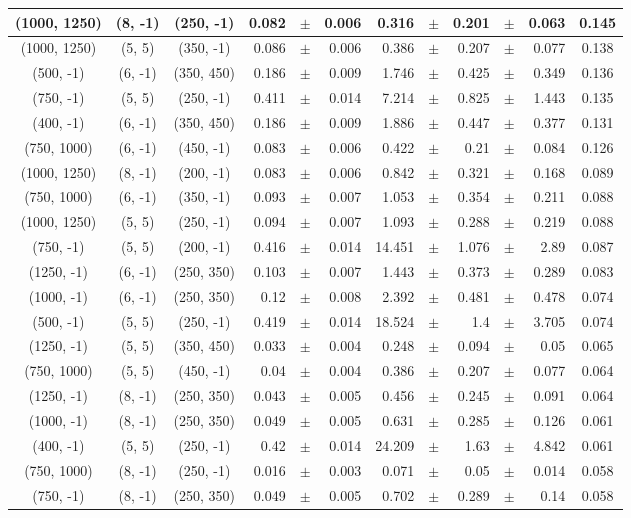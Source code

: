 \documentclass[12pt]{paper}
\begin{document}
\begin{table}[ht]
\begin{center}
{\begin{tabular}{|c|c|c|rrr|rrrrr|c|}
(1000, 1250)&(8, -1)&(250, -1)&0.082&$\pm$&0.006&0.316&$\pm$&0.201&$\pm$&0.063&0.145\\\hline
(1000, 1250)&(5, 5)&(350, -1)&0.086&$\pm$&0.006&0.386&$\pm$&0.207&$\pm$&0.077&0.138\\\hline
(500, -1)&(6, -1)&(350, 450)&0.186&$\pm$&0.009&1.746&$\pm$&0.425&$\pm$&0.349&0.136\\\hline
(750, -1)&(5, 5)&(250, -1)&0.411&$\pm$&0.014&7.214&$\pm$&0.825&$\pm$&1.443&0.135\\\hline
(400, -1)&(6, -1)&(350, 450)&0.186&$\pm$&0.009&1.886&$\pm$&0.447&$\pm$&0.377&0.131\\\hline
(750, 1000)&(6, -1)&(450, -1)&0.083&$\pm$&0.006&0.422&$\pm$&0.21&$\pm$&0.084&0.126\\\hline
(1000, 1250)&(8, -1)&(200, -1)&0.083&$\pm$&0.006&0.842&$\pm$&0.321&$\pm$&0.168&0.089\\\hline
(750, 1000)&(6, -1)&(350, -1)&0.093&$\pm$&0.007&1.053&$\pm$&0.354&$\pm$&0.211&0.088\\\hline
(1000, 1250)&(5, 5)&(250, -1)&0.094&$\pm$&0.007&1.093&$\pm$&0.288&$\pm$&0.219&0.088\\\hline
(750, -1)&(5, 5)&(200, -1)&0.416&$\pm$&0.014&14.451&$\pm$&1.076&$\pm$&2.89&0.087\\\hline
(1250, -1)&(6, -1)&(250, 350)&0.103&$\pm$&0.007&1.443&$\pm$&0.373&$\pm$&0.289&0.083\\\hline
(1000, -1)&(6, -1)&(250, 350)&0.12&$\pm$&0.008&2.392&$\pm$&0.481&$\pm$&0.478&0.074\\\hline
(500, -1)&(5, 5)&(250, -1)&0.419&$\pm$&0.014&18.524&$\pm$&1.4&$\pm$&3.705&0.074\\\hline
(1250, -1)&(5, 5)&(350, 450)&0.033&$\pm$&0.004&0.248&$\pm$&0.094&$\pm$&0.05&0.065\\\hline
(750, 1000)&(5, 5)&(450, -1)&0.04&$\pm$&0.004&0.386&$\pm$&0.207&$\pm$&0.077&0.064\\\hline
(1250, -1)&(8, -1)&(250, 350)&0.043&$\pm$&0.005&0.456&$\pm$&0.245&$\pm$&0.091&0.064\\\hline
(1000, -1)&(8, -1)&(250, 350)&0.049&$\pm$&0.005&0.631&$\pm$&0.285&$\pm$&0.126&0.061\\\hline
(400, -1)&(5, 5)&(250, -1)&0.42&$\pm$&0.014&24.209&$\pm$&1.63&$\pm$&4.842&0.061\\\hline
(750, 1000)&(8, -1)&(250, -1)&0.016&$\pm$&0.003&0.071&$\pm$&0.05&$\pm$&0.014&0.058\\\hline
(750, -1)&(8, -1)&(250, 350)&0.049&$\pm$&0.005&0.702&$\pm$&0.289&$\pm$&0.14&0.058\\\hline

\end{tabular}}
\end{center}
\end{table}
\end{document}
